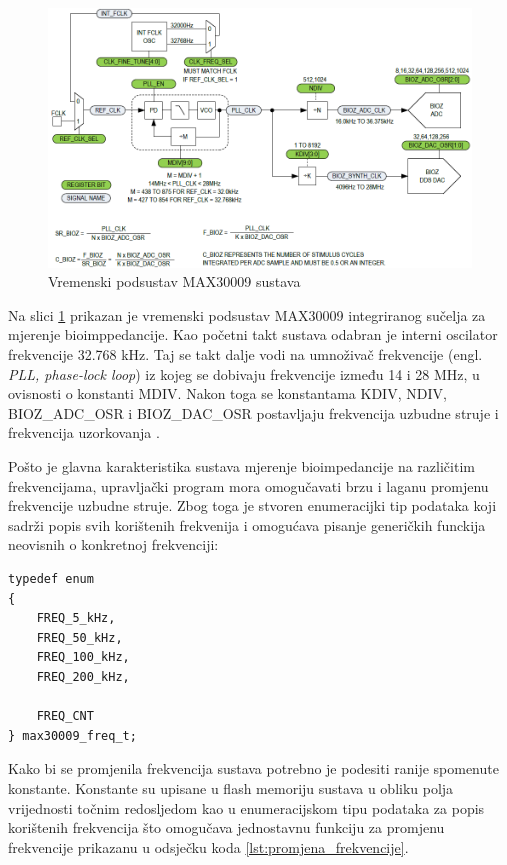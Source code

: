 \documentclass[../diplomski_rad.tex]{subfiles}
\begin{document}
\begin{figure}[htb]
    \centering
    \includegraphics[width=1\textwidth]{Figures/max30009_clock.png} 
    \caption{Vremenski podsustav MAX30009 sustava \cite{max30009_datasheet}}
    \label{slk:max_30009_clock}
\end{figure}

Na slici \ref{slk:max_30009_clock} prikazan je vremenski podsustav MAX30009 integriranog sučelja za mjerenje bioimppedancije.
Kao početni takt sustava odabran je interni oscilator frekvencije 32.768 kHz. Taj se takt dalje vodi na umnoživač frekvencije 
(engl. \textit{PLL, phase-lock loop}) iz kojeg se dobivaju frekvencije između 14 i 28 MHz, u ovisnosti o konstanti MDIV. 
Nakon toga se konstantama KDIV, NDIV, 
BIOZ\_ADC\_OSR i BIOZ\_DAC\_OSR postavljaju frekvencija uzbudne struje i frekvencija uzorkovanja \cite{max30009_datasheet}.   

Pošto je glavna karakteristika sustava mjerenje bioimpedancije na različitim frekvencijama, upravljački program mora 
omogučavati brzu i laganu promjenu frekvencije uzbudne struje. Zbog toga je stvoren enumeracijki tip podataka koji 
sadrži popis svih korištenih frekvenija i omogućava pisanje generičkih funckija neovisnih o konkretnoj frekvenciji: 
\begin{lstlisting}[label={lst:enumeracija_frekvencija},style=CStyle,caption={Enumeracijski tip podataka za odabir frekvencije rada},captionpos=b]
typedef enum
{
    FREQ_5_kHz,
    FREQ_50_kHz,
    FREQ_100_kHz,
    FREQ_200_kHz,
    
    FREQ_CNT
} max30009_freq_t;
\end{lstlisting} 

Kako bi se promjenila frekvencija sustava potrebno je podesiti ranije spomenute konstante. 
Konstante su upisane u flash memoriju sustava u obliku polja vrijednosti točnim redosljedom kao 
u enumeracijskom tipu podataka za popis korištenih frekvencija što omogučava jednostavnu funkciju 
za promjenu frekvencije prikazanu u odsječku koda \ref{lst:promjena_frekvencije}. 
\end{document}
